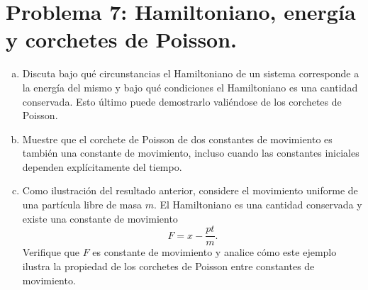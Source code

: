 \documentclass[a4paper]{article}
\begin{document}
\section{Problema 7: Hamiltoniano, energía y corchetes de Poisson.}

\begin{enumerate}[a)]
    \item Discuta bajo qué circunstancias el Hamiltoniano de un sistema corresponde a la energía del mismo y bajo qué condiciones el Hamiltoniano es una cantidad conservada. Esto último puede demostrarlo valiéndose de los corchetes de Poisson.
    
    \item Muestre que el corchete de Poisson de dos constantes de movimiento es también una constante de movimiento, incluso cuando las constantes iniciales dependen explícitamente del tiempo.
    
    \item Como ilustración del resultado anterior, considere el movimiento uniforme de una partícula libre de masa $m$. El Hamiltoniano es una cantidad conservada y existe una constante de movimiento
    $$F = x - \frac{pt}{m}.$$
    Verifique que $F$ es constante de movimiento y analice cómo este ejemplo ilustra la propiedad de los corchetes de Poisson entre constantes de movimiento.
\end{enumerate}


 
\end{document}
